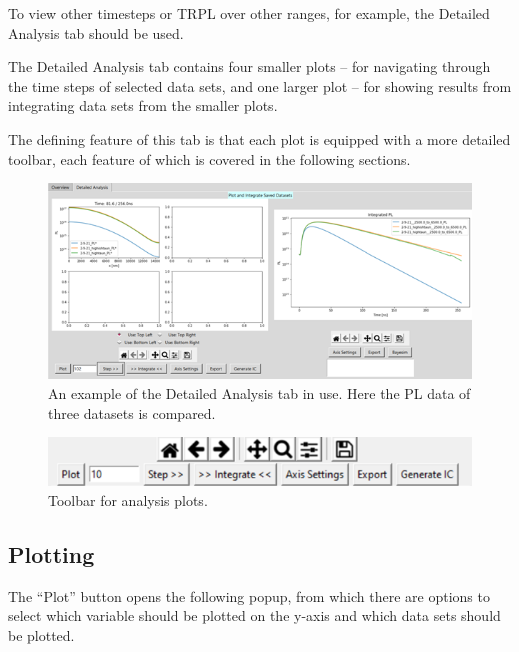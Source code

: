 \documentclass[11pt,letterpaper,titlepage]{article}
\begin{document}
		\par To view other timesteps or TRPL over other ranges, for example, the Detailed Analysis tab should be used.
		
		\par The Detailed Analysis tab contains four smaller plots – for navigating through the time steps of selected data sets, and one larger plot – for showing results from integrating data sets from the smaller plots.
		
		\par The defining feature of this tab is that each plot is equipped with a more detailed toolbar, each feature of which is covered in the following sections.
		
		\begin{figure}[H]
			\label{fig:detailed_example}
			\centering
			\includegraphics[scale=1]{"detailed_example"}
			\caption{An example of the Detailed Analysis tab in use. Here the PL data of three datasets is compared.}
		\end{figure}
		
		\begin{figure}[H]
			\label{fig:detailed_toolbar}
			\centering
			\includegraphics[scale=1]{"detailed_toolbar"}
			\caption {Toolbar for analysis plots.}
		\end{figure}
	
		\subsection{Plotting}
		
		\par The “Plot” button opens the following popup, from which there are options to select which variable should be plotted on the y-axis and which data sets should be plotted.
		
\end{document}
